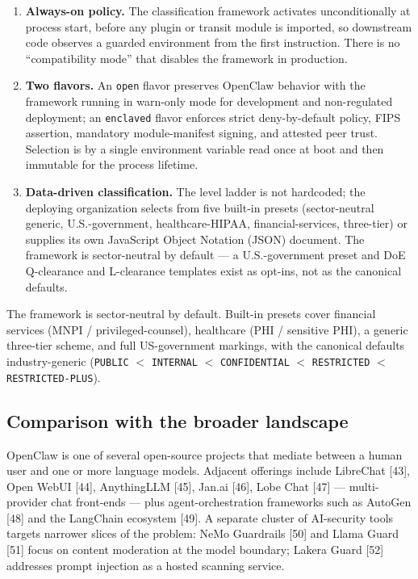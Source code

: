 \documentclass[11pt]{article}
\begin{document}
\begin{enumerate}
  \item \textbf{Always-on policy.} The classification framework
    activates unconditionally at process start, before any plugin or
    transit module is imported, so downstream code observes a guarded
    environment from the first instruction. There is no
    ``compatibility mode'' that disables the framework in production.
  \item \textbf{Two flavors.} An \texttt{open} flavor preserves
    OpenClaw behavior with the framework running in warn-only mode for
    development and non-regulated deployment; an \texttt{enclaved}
    flavor enforces strict deny-by-default policy, FIPS assertion,
    mandatory module-manifest signing, and attested peer trust.
    Selection is by a single environment variable read once at boot
    and then immutable for the process lifetime.
  \item \textbf{Data-driven classification.} The level ladder is not
    hardcoded; the deploying organization selects from five built-in
    presets (sector-neutral generic, U.S.-government, healthcare-HIPAA,
    financial-services, three-tier) or supplies its own JavaScript
    Object Notation (JSON) document. The framework is sector-neutral by
    default --- a U.S.-government preset and DoE Q-clearance and
    L-clearance templates exist as opt-ins, not as the canonical
    defaults.
\end{enumerate}

The framework is sector-neutral by default. Built-in presets cover
financial services (MNPI / privileged-counsel), healthcare (PHI /
sensitive PHI), a generic three-tier scheme, and full US-government
markings, with the canonical defaults industry-generic (\texttt{PUBLIC}
$<$ \texttt{INTERNAL} $<$ \texttt{CONFIDENTIAL} $<$ \texttt{RESTRICTED}
$<$ \texttt{RESTRICTED-PLUS}).

\subsection{Comparison with the broader landscape}
\label{sec:landscape}

OpenClaw is one of several open-source projects that mediate between a
human user and one or more language models. Adjacent offerings
include LibreChat [43], Open WebUI [44], AnythingLLM [45], Jan.ai
[46], Lobe Chat [47] --- multi-provider chat front-ends --- plus
agent-orchestration frameworks such as AutoGen [48] and the LangChain
ecosystem [49]. A separate cluster of AI-security tools targets
narrower slices of the problem: NeMo Guardrails [50] and Llama Guard
[51] focus on content moderation at the model boundary; Lakera Guard
[52] addresses prompt injection as a hosted scanning service.
\end{document}
